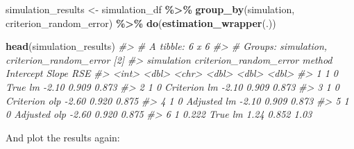 \documentclass[
]{book}
\newenvironment{Shaded}{\begin{snugshade}}{\end{snugshade}}
\newcommand{\CommentTok}[1]{\textcolor[rgb]{0.56,0.35,0.01}{\textit{#1}}}
\newcommand{\KeywordTok}[1]{\textcolor[rgb]{0.13,0.29,0.53}{\textbf{#1}}}
\newcommand{\NormalTok}[1]{#1}
\newcommand{\OperatorTok}[1]{\textcolor[rgb]{0.81,0.36,0.00}{\textbf{#1}}}
\newcommand{\StringTok}[1]{\textcolor[rgb]{0.31,0.60,0.02}{#1}}
\begin{document}
\begin{Shaded}
\begin{Highlighting}[]
\NormalTok{simulation\_results <{-}}\StringTok{ }\NormalTok{simulation\_df }\OperatorTok{\%>\%}
\StringTok{  }\KeywordTok{group\_by}\NormalTok{(simulation, criterion\_random\_error) }\OperatorTok{\%>\%}
\StringTok{  }\KeywordTok{do}\NormalTok{(}\KeywordTok{estimation\_wrapper}\NormalTok{(.))}


\KeywordTok{head}\NormalTok{(simulation\_results)}
\CommentTok{\#> \# A tibble: 6 x 6}
\CommentTok{\#> \# Groups:   simulation, criterion\_random\_error [2]}
\CommentTok{\#>   simulation criterion\_random\_error method        Intercept Slope   RSE}
\CommentTok{\#>        <int>                  <dbl> <chr>             <dbl> <dbl> <dbl>}
\CommentTok{\#> 1          1                  0     True lm           {-}2.10 0.909 0.873}
\CommentTok{\#> 2          1                  0     Criterion lm      {-}2.10 0.909 0.873}
\CommentTok{\#> 3          1                  0     Criterion olp     {-}2.60 0.920 0.875}
\CommentTok{\#> 4          1                  0     Adjusted lm       {-}2.10 0.909 0.873}
\CommentTok{\#> 5          1                  0     Adjusted olp      {-}2.60 0.920 0.875}
\CommentTok{\#> 6          1                  0.222 True lm            1.24 0.852 1.03}
\end{Highlighting}
\end{Shaded}

And plot the results again:
\end{document}
